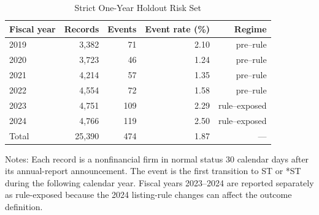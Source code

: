 \begin{table}[!htbp]
\centering
\caption{Strict One-Year Holdout Risk Set}
\label{tab:sample}
\begin{threeparttable}
\begin{tabular}{lrrrr}
\toprule
Fiscal year & Records & Events & Event rate (\%) & Regime \\
\midrule
2019 & 3,382 & 71 & 2.10 & pre--rule \\
2020 & 3,723 & 46 & 1.24 & pre--rule \\
2021 & 4,214 & 57 & 1.35 & pre--rule \\
2022 & 4,554 & 72 & 1.58 & pre--rule \\
2023 & 4,751 & 109 & 2.29 & rule--exposed \\
2024 & 4,766 & 119 & 2.50 & rule--exposed \\
\midrule
Total & 25,390 & 474 & 1.87 & --- \\
\bottomrule
\end{tabular}
\begin{tablenotes}[flushleft]\footnotesize
\item Notes: Each record is a nonfinancial firm in normal status 30 calendar days after its annual-report announcement. The event is the first transition to ST or *ST during the following calendar year. Fiscal years 2023--2024 are reported separately as rule-exposed because the 2024 listing-rule changes can affect the outcome definition.
\end{tablenotes}
\end{threeparttable}
\end{table}
